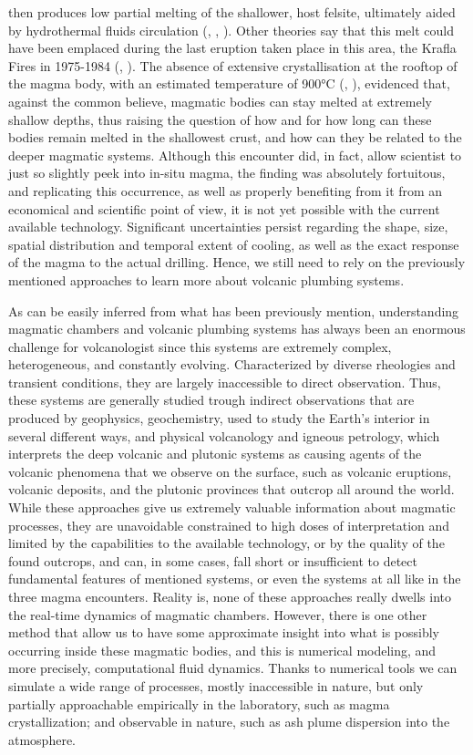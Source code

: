 then produces low partial melting of the shallower, host felsite, ultimately aided by hydrothermal fluids circulation (\cite{zierenberg2013}, \cite{masotta2018}, \cite{saubin2021}). Other theories say that this melt could have been emplaced during the last eruption taken place in this area, the Krafla Fires in 1975-1984 (\cite{axelsson2014}, \cite{eichelberger2020}). The absence of extensive crystallisation at the rooftop of the magma body, with an estimated temperature of 900°C (\cite{elders2011}, \cite{zierenberg2013}), evidenced that, against the common believe, magmatic bodies can stay melted at extremely shallow depths, thus raising the question of how and for how long can these bodies remain melted in the shallowest crust, and how can they be related to the deeper magmatic systems. Although this encounter did, in fact, allow scientist to just so slightly peek into in-situ magma, the finding was absolutely fortuitous, and replicating this occurrence, as well as properly benefiting from it from an economical and scientific point of view, it is not yet possible with the current available technology. Significant uncertainties persist regarding the shape, size, spatial distribution and temporal extent of cooling, as well as the exact response of the magma to the actual drilling. Hence, we still need to rely on the previously mentioned approaches to learn more about volcanic plumbing systems.

As can be easily inferred from what has been previously mention, understanding magmatic chambers and volcanic plumbing systems has always been an enormous challenge for volcanologist since this systems are extremely complex, heterogeneous, and constantly evolving. Characterized by diverse rheologies and transient conditions, they are largely inaccessible to direct observation. Thus, these systems are generally studied trough indirect observations that are produced by geophysics, geochemistry, used to study the Earth's interior in several different ways, and physical volcanology and igneous petrology, which interprets the deep volcanic and plutonic systems as causing agents of the volcanic phenomena that we observe on the surface, such as volcanic eruptions, volcanic deposits, and the plutonic provinces that outcrop all around the world. While these approaches give us extremely valuable information about magmatic processes, they are unavoidable constrained to high doses of interpretation and limited by the capabilities to the available technology, or by the quality of the found outcrops, and can, in some cases, fall short or insufficient to detect fundamental features of mentioned systems, or even the systems at all like in the three magma encounters. Reality is, none of these approaches really dwells into the real-time dynamics of magmatic chambers. However, there is one other method that allow us to have some approximate insight into what is possibly occurring inside these magmatic bodies, and this is numerical modeling, and more precisely, computational fluid dynamics. Thanks to numerical tools we can simulate a wide range of processes, mostly inaccessible in nature, but only partially approachable empirically in the laboratory, such as magma crystallization; and observable in nature, such as ash plume dispersion into the atmosphere.

